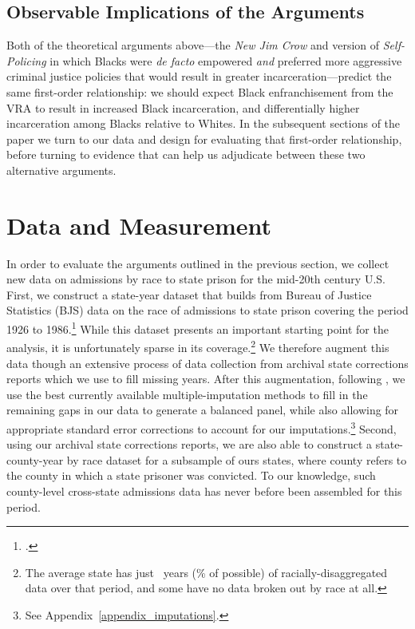 \documentclass[12pt]{article}
\begin{document}
\subsection*{Observable Implications of the Arguments}

Both of the theoretical arguments above---the \emph{New Jim Crow} and version of \emph{Self-Policing} in which Blacks were \emph{de facto} empowered \emph{and} preferred more aggressive criminal justice policies that would result in greater incarceration---predict the same first-order relationship: we should expect Black enfranchisement from the VRA to result in increased Black incarceration, and differentially higher incarceration among Blacks relative to Whites.  In the subsequent sections of the paper we turn to our data and design for evaluating that first-order relationship, before turning to evidence that can help us adjudicate between these two alternative arguments.








\section{Data and Measurement}

In order to evaluate the arguments outlined in the previous section, we collect new data on admissions by race to state prison for the mid-20th century U.S.  First, we construct a state-year dataset that builds from Bureau of Justice Statistics (BJS) data on the race of admissions to state prison covering the period 1926 to 1986.\footnote{\cite{RaceofPrisonersAd:1999ds}.}  While this dataset presents an important starting point for the analysis, it is unfortunately sparse in its coverage.\footnote{The average state has just \unskip~years (\unskip\% of possible) of racially-disaggregated data over that period, and some have no data broken out by race at all.}  We therefore augment this data though an extensive process of data collection from archival state corrections reports which we use to fill missing years. After this augmentation, following \cite{Honaker:2010wb}, we use the best currently available multiple-imputation methods to fill in the remaining gaps in our data to generate a balanced panel, while also allowing for appropriate standard error corrections to account for our imputations.\footnote{See Appendix~\ref{appendix_imputations}.}  Second, using our archival state corrections reports, we are also able to construct a state-county-year by race dataset for a subsample of ours states, where county refers to the county in which a state prisoner was convicted.  To our knowledge, such county-level cross-state admissions data has never before been assembled for this period.
\end{document}
